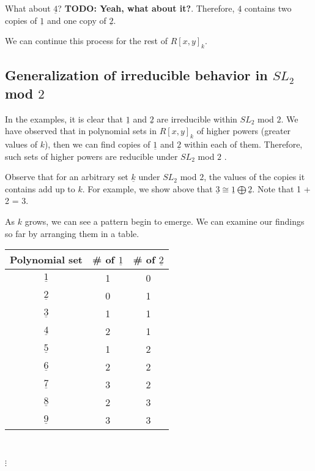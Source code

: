 \documentclass[a4paper,draft]{amsproc}
\theoremstyle{plain}
\theoremstyle{definition}
\theoremstyle{remark}
\numberwithin{equation}{section}
\begin{document}
What about $\underline{4}$? \textbf{TODO: Yeah, what about it?}. Therefore, $\underline{4}$ contains two copies of $\underline{1}$ and one copy of $\underline{2}$. 

We can continue this process for the rest of $R[x,y]_{k}$. 

\subsection{Generalization of irreducible behavior in $SL_{2}$ mod $2$}
In the examples, it is clear that $\underline{1}$ and $\underline{2}$ are irreducible within $SL_{2}$ mod $2$. We have observed that in polynomial sets in $R[x,y]_{k}$  of higher powers (greater values of $k$), then we can find copies of $\underline{1}$ and $\underline{2}$ within each of them. Therefore, such sets of higher powers are reducible under $SL_{2}$ mod $2$ . 

Observe that for an arbitrary set $\underline{k}$ under $SL_{2}$ mod $2$, the values of the copies it contains add up to $k$. For example, we show above that $\underline{3} \cong \underline{1} \bigoplus \underline{2}$. Note that 1 + 2 = 3. 

As $k$ grows, we can see a pattern begin to emerge. We can examine our findings so far by arranging them in a table. 

\begin{table}
    \begin{tabular}{|c|c|c|} 
	\hline
    Polynomial set & \# of $\underline{1}$ & \# of $\underline{2}$ \\ \hline
    $\underline{1}$ & 1 & 0 \\ \hline
    $\underline{2}$ & 0 & 1 \\ \hline
    $\underline{3}$ & 1 & 1 \\ \hline
    $\underline{4}$ & 2 & 1 \\ \hline
    $\underline{5}$ & 1 & 2 \\ \hline
    $\underline{6}$ & 2 & 2 \\ \hline
    $\underline{7}$ & 3 & 2 \\ \hline
    $\underline{8}$ & 2 & 3 \\ \hline
    $\underline{9}$ & 3 & 3 \\ \hline
    \end{tabular} \\
\begin{centering}$\vdots$\end{centering}
\end{table}
\end{document}
